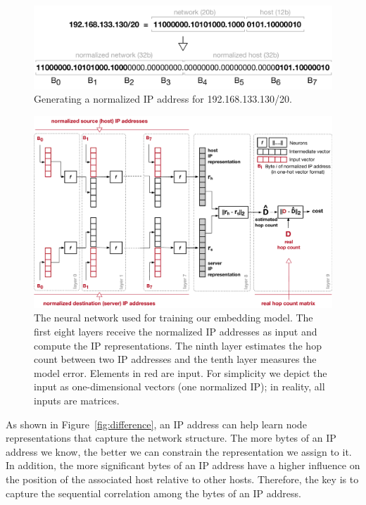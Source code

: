 \begin{figure}
	\begin{center}
	\includegraphics[width=.8\linewidth]{Graph/dip/normalized-ip}
		\end{center}
	\caption{Generating a normalized IP address for 192.168.133.130/20.}
	\label{fig:normalizedip}
\end{figure}

\begin{figure}[t]
	\begin{center}
			\includegraphics[width=.9\textwidth]{Graph/dip/neural-network-2}
	\end{center}

	\caption{The neural network used for training our embedding model. The first eight layers receive the normalized IP addresses as input and compute the IP representations. The ninth layer estimates the hop count between two IP addresses and the tenth layer measures the model error. Elements in red are input. For simplicity we depict the input as one-dimensional vectors (one normalized IP); in reality, all inputs are matrices.}
	\label{fig:neuralnetwork}
\end{figure}

As shown in Figure~\ref{fig:difference}, an IP address can help learn node representations that capture the network structure. The more bytes of an IP address we know, the better we can constrain the representation we assign to it. In addition, the more significant bytes of an IP address have a higher influence on the position of the associated host relative to other hosts. Therefore, the key is to capture the sequential correlation among the bytes of an IP address. %

